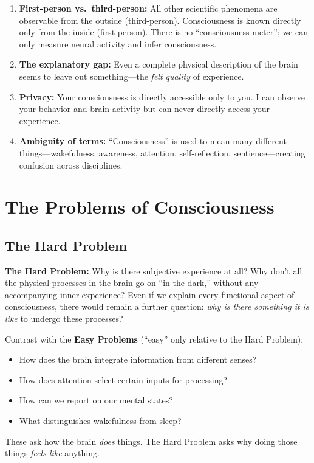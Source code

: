 \documentclass[11pt,a4paper]{report}
\begin{document}
\begin{conceptbox}
\begin{enumerate}[leftmargin=1.5em]
  \item \textbf{First-person vs.\ third-person:} All other scientific phenomena are observable from the outside (third-person). Consciousness is known directly only from the inside (first-person). There is no ``consciousness-meter''; we can only measure neural activity and infer consciousness.
  \item \textbf{The explanatory gap:} Even a complete physical description of the brain seems to leave out something---the \emph{felt quality} of experience.
  \item \textbf{Privacy:} Your consciousness is directly accessible only to you. I can observe your behavior and brain activity but can never directly access your experience.
  \item \textbf{Ambiguity of terms:} ``Consciousness'' is used to mean many different things---wakefulness, awareness, attention, self-reflection, sentience---creating confusion across disciplines.
\end{enumerate}
\end{conceptbox}


\chapter{The Problems of Consciousness}

\section{The Hard Problem}

\begin{definitionbox}
\textbf{The Hard Problem:} Why is there subjective experience at all? Why don't all the physical processes in the brain go on ``in the dark,'' without any accompanying inner experience? Even if we explain every functional aspect of consciousness, there would remain a further question: \emph{why is there something it is like} to undergo these processes?

Contrast with the \textbf{Easy Problems} (``easy'' only relative to the Hard Problem):
\begin{itemize}[leftmargin=1.5em]
  \item How does the brain integrate information from different senses?
  \item How does attention select certain inputs for processing?
  \item How can we report on our mental states?
  \item What distinguishes wakefulness from sleep?
\end{itemize}
These ask how the brain \emph{does} things. The Hard Problem asks why doing those things \emph{feels like} anything.
\end{definitionbox}
\end{document}
